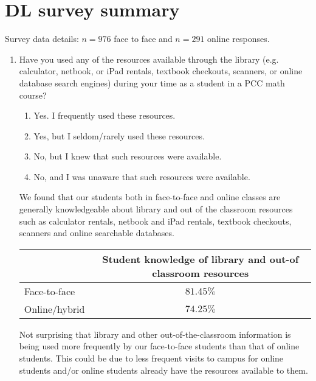 \chapter{DL survey summary}\label{app:sec:dlsurveysummary}
Survey data details: $n=976$ face to face and $n=291$ online responses.

\begin{enumerate}
	\item Have you used any of the resources available through the library (e.g. calculator, netbook, or iPad rentals, textbook checkouts, scanners, or online database search engines) during your time as a student in a PCC math course?
	\begin{enumerate}
		\item     Yes. I frequently used these resources.
		\item    Yes, but I seldom/rarely used these resources.
		\item     No, but I knew that such resources were available.
		\item     No, and I was unaware that such resources were available.
	\end{enumerate}
	We found that our students both in face-to-face and online classes are generally knowledgeable about library and out of the classroom resources such as calculator rentals, netbook and iPad rentals, textbook checkouts, scanners and online searchable databases.
		
	\begin{tabular}{lc}
		\toprule
		              & Student knowledge of library and out-of classroom resources \\
		\midrule
		Face-to-face  & $81.45\%$                                                   \\
		Online/hybrid & $74.25\%$                                                   \\
		\bottomrule
	\end{tabular}
	
	Not surprising that library and other out-of-the-classroom information is being used more frequently by our face-to-face students than that of online students. This could be due to less frequent visits to campus for online students and/or online students already have the resources available to them. 
	

\end{enumerate}
